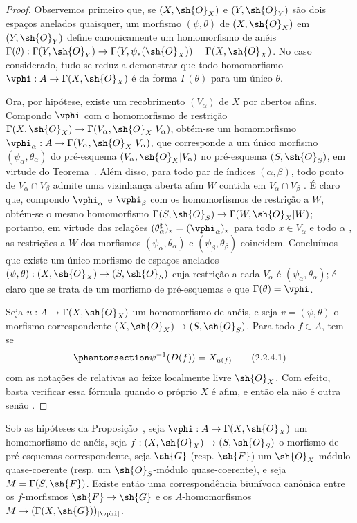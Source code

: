 \documentclass[oneside]{amsart}
\makeatletter
\newcommand{\ega@arrow}[2]{\mathchoice{#1}{#2}{#2}{#2}}
\renewcommand{\to}{\ega@arrow{\longrightarrow}{\rightarrow}}
\newcommand{\oldpage}[2][]{{\marginnote{\normalfont\textbf{#1}~|~#2}}\ignorespaces}
\let\EGAOriginalLabel\label
\renewcommand{\label}[1]{\phantomsection\EGAOriginalLabel{#1}}
\makeatother
\begin{document}
\begin{proof}
Observemos primeiro que, se $(X,\sh{O}_X)$ e $(Y,\sh{O}_Y)$ são dois
espaços anelados quaisquer, um morfismo $(\psi,\theta)$ de
$(X,\sh{O}_X)$ em $(Y,\sh{O}_Y)$ define canonicamente um homomorfismo
de anéis
$\Gamma(\theta):\Gamma(Y,\sh{O}_Y)\to
\Gamma(Y,\psi_*(\sh{O}_X))=\Gamma(X,\sh{O}_X)$.
No caso considerado, tudo se reduz a demonstrar que todo homomorfismo
$\vphi:A\to\Gamma(X,\sh{O}_X)$ é da forma $\Gamma(\theta)$ para um
único $\theta$.

Ora, por hipótese, existe um recobrimento $(V_\alpha)$ de $X$ por
abertos afins. Compondo $\vphi$ com o homomorfismo de restrição
$\Gamma(X,\sh{O}_X)\to\Gamma(V_\alpha,\sh{O}_X|V_\alpha)$, obtém-se um
homomorfismo
$\vphi_\alpha:A\to\Gamma(V_\alpha,\sh{O}_X|V_\alpha)$, que corresponde a
um único morfismo $(\psi_\alpha,\theta_\alpha)$ do pré-esquema
$(V_\alpha,\sh{O}_X|V_\alpha)$ no pré-esquema $(S,\sh{O}_S)$, em virtude
do Teorema~.
Além disso, para todo par de índices $(\alpha,\beta)$, todo ponto de
$V_\alpha\cap V_\beta$ admite uma vizinhança aberta afim $W$ contida em
$V_\alpha\cap V_\beta$ . É claro que, compondo
$\vphi_\alpha$ e $\vphi_\beta$ com os homomorfismos de restrição a $W$,
obtém-se o mesmo homomorfismo
$\Gamma(S,\sh{O}_S)\to\Gamma(W,\sh{O}_X|W)$; portanto, em virtude das
relações $(\theta_\alpha^\sharp)_x=(\vphi_\alpha)_x$ para todo
$x\in V_\alpha$ e todo $\alpha$ , as restrições a $W$ dos
morfismos $(\psi_\alpha,\theta_\alpha)$ e
$(\psi_\beta,\theta_\beta)$ coincidem.
Concluímos que existe um único morfismo de espaços anelados
$(\psi,\theta):(X,\sh{O}_X)\to(S,\sh{O}_S)$ cuja restrição a cada
$V_\alpha$ é $(\psi_\alpha,\theta_\alpha)$; é claro que se trata de um
morfismo de pré-esquemas e que $\Gamma(\theta)=\vphi$.

Seja $u:A\to\Gamma(X,\sh{O}_X)$ um homomorfismo de anéis, e seja
$v=(\psi,\theta)$ o morfismo correspondente
$(X,\sh{O}_X)\to(S,\sh{O}_S)$. Para todo $f\in A$, tem-se
\[
  \label{I.2.2.4.1}
  \psi^{-1}(D(f))=X_{u(f)}
  \tag{2.2.4.1}
\]
com as notações de  relativas ao feixe localmente livre
$\sh{O}_X$. Com efeito, basta verificar essa fórmula quando o próprio $X$
é afim, e então ela não é outra senão .
\end{proof}

\begin{proposition}[2.2.5]
\label{I.2.2.5}
Sob as hipóteses da Proposição~, seja
$\vphi:A\to\Gamma(X,\sh{O}_X)$ um homomorfismo de anéis, seja
$f:(X,\sh{O}_X)\to(S,\sh{O}_S)$ o morfismo de pré-esquemas correspondente,
seja $\sh{G}$ (resp. $\sh{F}$) um $\sh{O}_X$-módulo quase-coerente
(resp. um $\sh{O}_S$-módulo quase-coerente), e seja
$M=\Gamma(S,\sh{F})$. Existe então uma correspondência biunívoca canônica
\oldpage[I]{100}
entre os $f$-morfismos $\sh{F}\to\sh{G}$  e os
$A$-homomorfismos $M\to(\Gamma(X,\sh{G}))_{[\vphi]}$.
\end{proposition}
\end{document}
